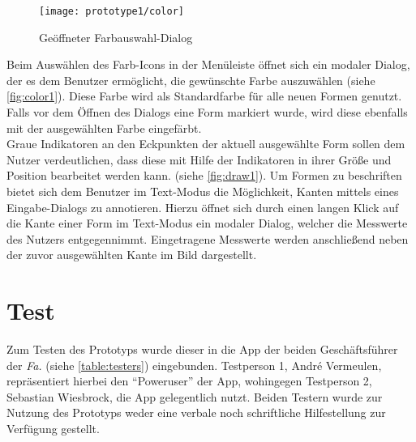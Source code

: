 \begin{wrapfigure}{R}{0.4\textwidth}
  \centering
  \texttt{[image: prototype1/color]}
  \caption{Geöffneter Farbauswahl-Dialog}
  \label{fig:color1}
\end{wrapfigure}

Beim Auswählen des Farb-Icons in der Menüleiste öffnet sich ein modaler Dialog, der es dem Benutzer ermöglicht, die gewünschte Farbe auszuwählen (siehe \autoref{fig:color1}).
Diese Farbe wird als Standardfarbe für alle neuen Formen genutzt.
Falls vor dem Öffnen des Dialogs eine Form markiert wurde, wird diese ebenfalls mit der ausgewählten Farbe eingefärbt. \\

Graue Indikatoren an den Eckpunkten der aktuell ausgewählte Form sollen dem Nutzer verdeutlichen, dass diese mit Hilfe der Indikatoren in ihrer Größe und Position bearbeitet werden kann. (siehe \autoref{fig:draw1}).
Um Formen zu beschriften bietet sich dem Benutzer im Text-Modus die Möglichkeit, Kanten mittels eines Eingabe-Dialogs zu annotieren.
Hierzu öffnet sich durch einen langen Klick auf die Kante einer Form im Text-Modus ein modaler Dialog, welcher die Messwerte des Nutzers entgegennimmt.
Eingetragene Messwerte werden anschließend neben der zuvor ausgewählten Kante im Bild dargestellt. 


\section{Test}\label{sec:test1}
Zum Testen des Prototyps wurde dieser in die App der beiden Geschäftsführer der \emph{Fa.} \vr{} (siehe \autoref{table:testers}) eingebunden.
Testperson 1, André Vermeulen, repräsentiert hierbei den ``Poweruser'' der App, wohingegen Testperson 2, Sebastian Wiesbrock, die App gelegentlich nutzt.
Beiden Testern wurde zur Nutzung des Prototyps weder eine verbale noch schriftliche Hilfestellung zur Verfügung gestellt. \\

